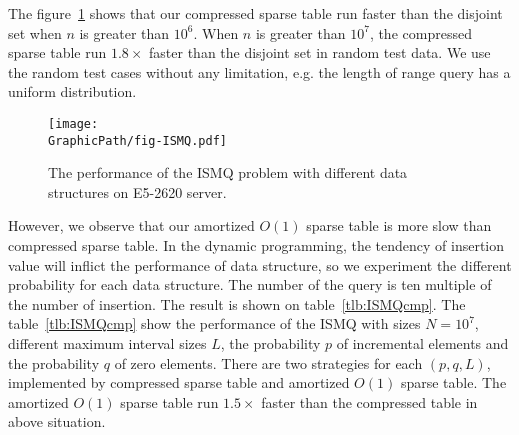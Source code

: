 \iffalse
\begin{itemize}
  \item 并查集 (Disjoint Set): 平均運行時間 $o(\alpha(n))$。只使用路徑壓縮技巧。
  \item 稀疏表 (Sparse Table): 插入 $O(\log n)$、詢問 $O(1)$。實作陣列宣告採用 $\tt{table}[\log N][N]$ 以減少快取未中。
  \item 樹狀數組 (Binary Indexed Tree): 插入、詢問均為 $O(\log n)$。
  \item 壓縮稀疏表 (Compressed Sparse Tree): 插入均攤 $O(1)$、詢問操作 $O(s)$，
  其中 $s$ 為拆分到區塊大小。實作時，維護區塊前綴和後綴最大值降低詢問複雜度至 $O(1)$，當發生 in-block 詢問再運行 $O(s)$ 算法。
\end{itemize}
\fi

The figure~\ref{fig:fig-ISMQcmp} shows that our compressed sparse table
run faster than the disjoint set when $n$ is greater than  $10^6$.  When
$n$ is greater than $10^7$, the compressed sparse table run $1.8 \times$
faster than the disjoint set in random test data.  We use the
random test cases without any limitation, e.g. the length of range
query has a uniform distribution.

\begin{figure}[!thb]
  \centering
  \texttt{[image: \\GraphicPath/fig-ISMQ.pdf]}
  \caption{
  The performance of the ISMQ problem with different data structures on 
  E5-2620 server.
  }
  \label{fig:fig-ISMQcmp}
\end{figure}

However, we observe that our amortized $O(1)$ sparse table is more slow
than compressed sparse table.  In the dynamic programming, the tendency
of insertion value will inflict the performance of data structure, so we
experiment the different probability for each data structure.  The
number of the query is ten multiple of the number of insertion.  The
result is shown on table~\ref{tlb:ISMQcmp}.  The table~\ref{tlb:ISMQcmp}
show the performance of the ISMQ with sizes $N = 10^7$, different
maximum interval sizes $L$, the probability $p$ of incremental elements
and the probability $q$ of zero elements. There are two strategies for
each $(p, q, L)$, implemented by compressed sparse table and amortized
$O(1)$ sparse table.  The amortized $O(1)$ sparse table run $1.5 \times$
faster than the compressed table in above situation.

\iffalse
當運行 $n > 10^6$ 時，我們提出的壓縮稀疏表的效能已經勝過并查集的版本，
其運行結果如圖表 ~\ref{fig:fig-ISMQcmp}。在 $n = 10^7$ 時，加速 $1.25 \times$。
然而，我們提供的 amortized $\theta(1)$ 的稀疏表慢於并查集，
我們做了深入的機率探討 (參照表 ~\ref{tlb:ISMQcmp})，由於大部分的操作都被區塊後綴和前綴解決，
沒有實際運用到內部詢問，約束區間詢問的大小為 $L$，在 $N = 10^7$ 時，最多能加速 $1.26 \times$，
其中插入和詢問比例為 1:10，當詢問比重更大時，將有更明顯的加速。
\fi

